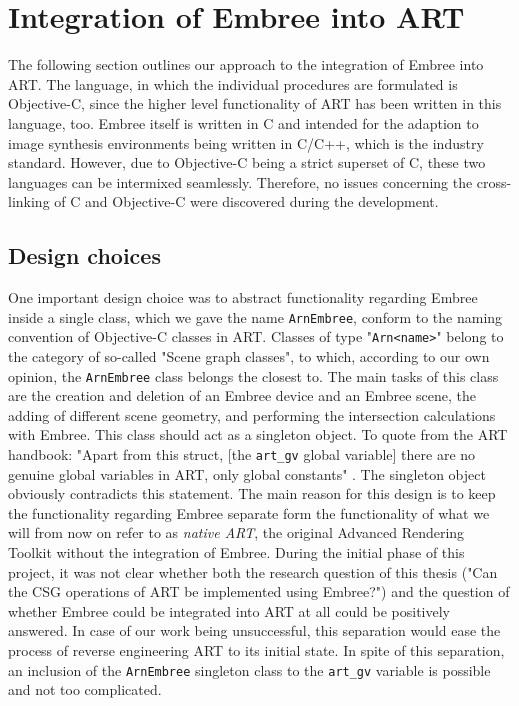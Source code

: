 \chapter{Integration of Embree into ART}
\label{chap:integration}

The following section outlines our approach to the integration of Embree into ART. The language, in which the individual procedures are formulated is Objective-C, since the higher level functionality of ART has been written in this language, too. Embree itself is written in C and intended for the adaption to image synthesis environments being written in C/C++, which is the industry standard. However, due to Objective-C being a strict superset of C, these two languages can be intermixed seamlessly. Therefore, no issues concerning the cross-linking of C and Objective-C were discovered during the development.

\section{Design choices}

One important design choice was to abstract functionality regarding Embree inside a single class, which we gave the name \texttt{ArnEmbree}, conform to the naming convention of Objective-C classes in ART. Classes of type "\texttt{Arn<name>}" belong to the category of so-called "Scene graph classes", to which, according to our own opinion, the \texttt{ArnEmbree} class belongs the closest to. The main tasks of this class are the creation and deletion of an Embree device and an Embree scene, the adding of different scene geometry, and performing the intersection calculations with Embree. This class should act as a singleton object. To quote from the ART handbook: "Apart from this struct, [the \texttt{art\_gv} global variable] there are no genuine global variables in ART, only global constants" \cite[Chapter 4.1.2]{arthandbook}. The singleton object obviously contradicts this statement. The main reason for this design is to keep the functionality regarding Embree separate form the functionality of what we will from now on refer to as \emph{native ART}, the original Advanced Rendering Toolkit without the integration of Embree. During the initial phase of this project, it was not clear whether both the research question of this thesis ("Can the CSG operations of ART be implemented using Embree?") and the question of whether Embree could be integrated into ART at all could be positively answered. In case of our work being unsuccessful, this separation would ease the process of reverse engineering ART to its initial state.
In spite of this separation, an inclusion of the \texttt{ArnEmbree} singleton class to the \texttt{art\_gv} variable is possible and not too complicated.

